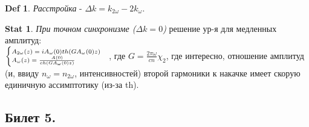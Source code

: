 \documentclass[a4paper,12pt]{article}
\theoremstyle{definition} %
\newtheorem{Stat}{Stat}[section]
\theoremstyle{definition} %
\newtheorem{Def}{Def}[section]
\theoremstyle{remark} %
\begin{document}
\begin{Def}\label{def \theDef}
	\textit{Расстройка} - $\Delta k = k_{2\omega}-2k_{\omega}$.
\end{Def}
\begin{Stat}\label{stat \theStat}
	\textit{При точном синхронизме ($\Delta k = 0$)} решение ур-я для медленных амплитуд: \\$\scriptsize
	\begin{cases}
		A_{2\omega}(z)=iA_{\omega}(0)th(GA_{\omega}(0)z) \\
		A_{\omega}(z)=\frac{A(0)}{ch(GA_{\omega}(0)z)}
	\end{cases}$, где $G=\frac{2\pi \omega}{cn}\chi_{2}$, где интересно, отношение амплитуд (и, ввиду $n_{\omega}=n_{2\omega}$, интенсивностей) второй гармоники к накачке имеет скорую единичную ассимптотику (из-за th).
\end{Stat}
	
\subsection{Билет 5.}
\end{document}
